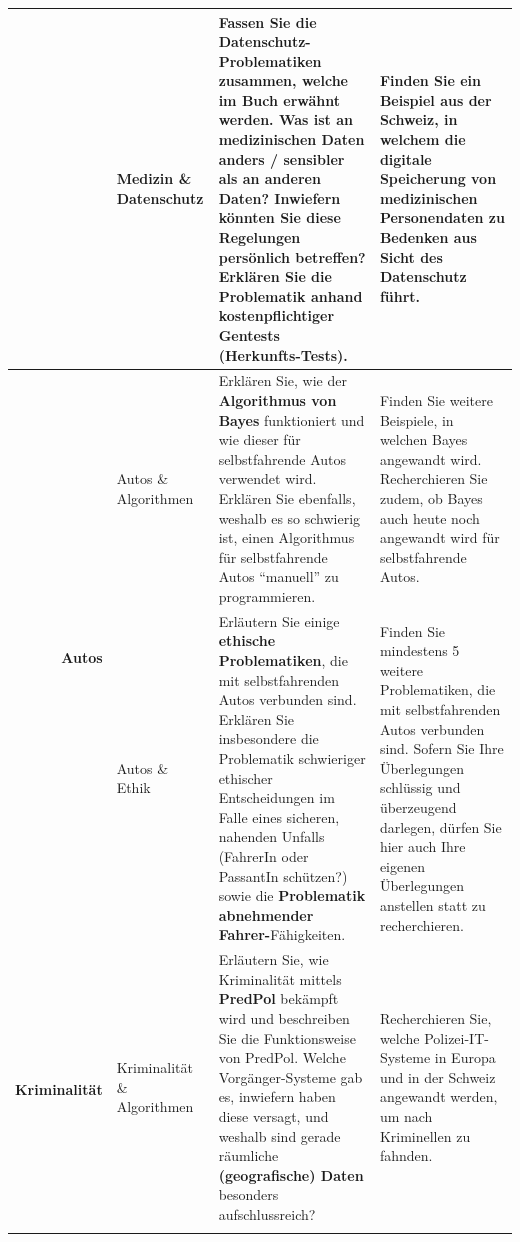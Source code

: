 \begin{landscape}
\begin{longtable}{@{}r|p{5.3cm}||p{10cm}|p{10cm}@{}}
		                              & Medizin \& Datenschutz                & Fassen Sie die \textbf{Datenschutz-Problematiken} zusammen, welche im Buch erwähnt werden. Was ist an medizinischen Daten anders / sensibler als an anderen Daten? Inwiefern könnten Sie diese Regelungen persönlich betreffen?  Erklären Sie die Problematik anhand kostenpflichtiger \textbf{Gentests} (Herkunfts-Tests).                                                                   & Finden Sie ein Beispiel aus der Schweiz, in welchem die digitale Speicherung von medizinischen Personendaten zu Bedenken aus Sicht des Datenschutz führt.                                                                                                                        \\\midrule\midrule
		\multirow{2}{*}{\textbf{Autos}}        & Autos \& Algorithmen                  & Erklären Sie, wie der \textbf{Algorithmus von Bayes} funktioniert und wie dieser für selbstfahrende Autos verwendet wird. Erklären Sie ebenfalls, weshalb es so schwierig ist, einen Algorithmus für selbstfahrende Autos ``manuell'' zu programmieren.                                                                                                                              & Finden Sie weitere Beispiele, in welchen Bayes angewandt wird. Recherchieren Sie zudem, ob Bayes auch heute noch angewandt wird für selbstfahrende Autos.                                                                                                                        \\\cmidrule(l){2-4}
		                              & Autos \& Ethik                        & Erläutern Sie einige \textbf{ethische Problematiken}, die mit selbstfahrenden Autos verbunden sind. Erklären Sie insbesondere die Problematik schwieriger ethischer Entscheidungen im Falle eines sicheren, nahenden Unfalls (FahrerIn oder PassantIn schützen?) sowie die \textbf{Problematik abnehmender Fahrer-}Fähigkeiten.                                                               & Finden Sie mindestens 5 weitere Problematiken, die mit selbstfahrenden Autos verbunden sind. Sofern Sie Ihre Überlegungen schlüssig und überzeugend darlegen, dürfen Sie hier auch Ihre eigenen Überlegungen anstellen statt zu recherchieren.                                   \\\midrule\midrule
		\multirow{2}{*}{\textbf{Kriminalität}} & Kriminalität \& Algorithmen           & Erläutern Sie, wie Kriminalität mittels \textbf{PredPol} bekämpft wird und beschreiben Sie die Funktionsweise von PredPol. Welche Vorgänger-Systeme gab es, inwiefern haben diese versagt, und weshalb sind gerade räumliche \textbf{(geografische) Daten} besonders aufschlussreich?                                                                                                         & Recherchieren Sie, welche Polizei-IT-Systeme in Europa und in der Schweiz angewandt werden, um nach Kriminellen zu fahnden.                                                                                                                                                      \\\cmidrule(l){2-4}

\end{longtable}
\end{landscape}
